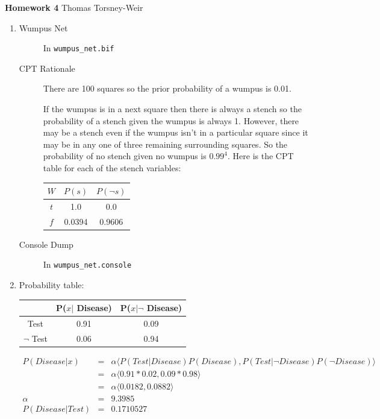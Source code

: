 \documentclass[10pt]{article}
\begin{document}
{\bf Homework 4} \hfill {\raggedleft Thomas Torsney-Weir}

\begin{enumerate}
\item %
  \begin{description}
  \item[Wumpus Net] In {\tt wumpus\_net.bif}
  \item[CPT Rationale] 
    There are 100 squares so the prior probability of a wumpus is 0.01.

    If the wumpus is in a next square then there is always a stench so
    the probability of a stench given the wumpus is always 1.  However, 
    there may be a stench even if the wumpus isn't in a particular square
    since it may be in any one of three remaining surrounding squares.  So
    the probability of no stench given no wumpus is $0.99^4$.  Here is the
    CPT table for each of the stench variables: \\
    \begin{tabular}{|c|c|c|}
    \hline
    $W$  &  $P(s)$ & $P(\neg s)$ \\ \hline
    $t$  &  1.0    & 0.0 \\
    $f$  &  0.0394 & 0.9606 \\
    \hline
    \end{tabular}

  \item[Console Dump] In {\tt wumpus\_net.console}
  \end{description}

\item %
  Probability table: \\
  \begin{tabular}{|c|c|c|}
  \hline
              & P($x |$ Disease) & P($x | \neg$ Disease) \\ \hline
  Test        & 0.91             & 0.09                  \\ \hline
  $\neg$ Test & 0.06             & 0.94                  \\ 
  \hline
  \end{tabular}

  \begin{eqnarray*}
  P(Disease | x)    & = & \alpha \langle P(Test | Disease) P(Disease),
                             P(Test | \neg Disease) P(\neg Disease) \rangle \\
                    & = & \alpha \langle 0.91 * 0.02, 0.09 * 0.98 \rangle \\
                    & = & \alpha \langle 0.0182, 0.0882 \rangle \\
  \alpha            & = & 9.3985 \\
  P(Disease | Test) & = & 0.1710527
  \end{eqnarray*}


\end{enumerate}
\end{document}
